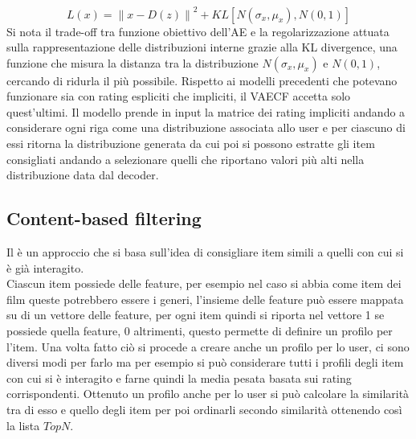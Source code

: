 $$L(x) = \left\lVert x - D(z) \right\rVert^2 + KL[N(\sigma_x, \mu_x),N(0,1)]$$
Si nota il trade-off tra funzione obiettivo dell'AE e la regolarizzazione attuata sulla rappresentazione delle distribuzioni interne grazie alla KL divergence, una funzione che misura la distanza tra la distribuzione $N(\sigma_x, \mu_x)$ e $N(0,1)$, cercando di ridurla il più possibile.
Rispetto ai modelli precedenti che potevano funzionare sia con rating espliciti che impliciti, il VAECF accetta solo quest'ultimi. Il modello prende in input la matrice dei rating impliciti andando a considerare ogni riga come una distribuzione associata allo user e per ciascuno di essi ritorna la distribuzione generata da cui poi si possono estratte gli item consigliati andando a selezionare quelli che riportano valori più alti nella distribuzione data dal decoder.

\subsection{Content-based filtering}
Il  è un approccio che si basa sull'idea di consigliare item simili a quelli con cui si è già interagito.\\
Ciascun item possiede delle feature, per esempio nel caso si abbia come item dei film queste potrebbero essere i generi, l'insieme delle feature può essere mappata su di un vettore delle feature, per ogni item quindi si riporta nel vettore 1 se possiede quella feature, 0 altrimenti, questo permette di definire un profilo per l'item.
Una volta fatto ciò si procede a creare anche un profilo per lo user, ci sono diversi modi per farlo ma per esempio si può considerare tutti i profili degli item con cui si è interagito e farne quindi la media pesata basata sui rating corrispondenti.
Ottenuto un profilo anche per lo user si può calcolare la similarità tra di esso e quello degli item per poi ordinarli secondo similarità ottenendo così la lista $TopN$.

